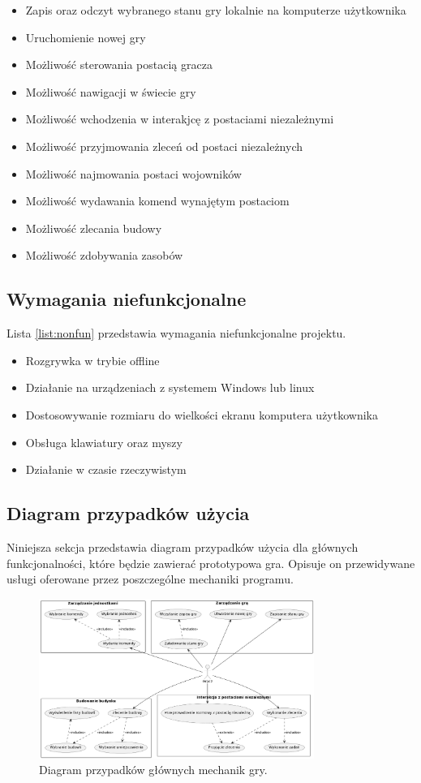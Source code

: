 \begin{itemize}\label{list:fun}
  \item Zapis oraz odczyt wybranego stanu gry lokalnie na komputerze użytkownika
  \item Uruchomienie nowej gry
  \item Możliwość sterowania postacią gracza
  \item Możliwość nawigacji w świecie gry
  \item Możliwość wchodzenia w interakjcę z postaciami niezależnymi
  \item Możliwość przyjmowania zleceń od postaci niezależnych
  \item Możliwość najmowania postaci wojowników
  \item Możliwość wydawania komend wynajętym postaciom
  \item Możliwość zlecania budowy
  \item Możliwość zdobywania zasobów
\end{itemize}

\subsection{Wymagania niefunkcjonalne}\label{ss:nonfun}
Lista \ref{list:nonfun} przedstawia wymagania niefunkcjonalne projektu.

\begin{itemize}\label{list:nonfun}
  \item Rozgrywka w trybie offline
  \item Działanie na urządzeniach z systemem Windows lub linux
  \item Dostosowywanie rozmiaru do wielkości ekranu komputera użytkownika
  \item Obsługa klawiatury oraz myszy
  \item Działanie w czasie rzeczywistym
\end{itemize}

\subsection{Diagram przypadków użycia}\label{ss:usecase}
Niniejsza sekcja przedstawia diagram przypadków użycia dla głównych funkcjonalności, które będzie zawierać prototypowa gra.
Opisuje on przewidywane usługi oferowane przez poszczególne mechaniki programu.
\begin{figure}[!htbp]
    \centering
    \includegraphics[width=0.8\textwidth]{images/diagrams/usecase.png}
    \caption{Diagram przypadków głównych mechanik gry.}\label{fig:usecases}
\end{figure}

